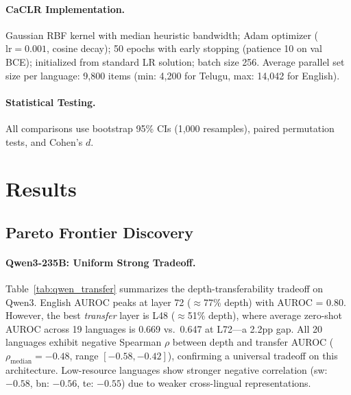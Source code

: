 \documentclass[11pt,a4paper]{article}
\begin{document}
\paragraph{CaCLR Implementation.}
Gaussian RBF kernel with median heuristic bandwidth; Adam optimizer ($\text{lr} = 0.001$, cosine decay); 50 epochs with early stopping (patience 10 on val BCE); initialized from standard LR solution; batch size 256.
Average parallel set size per language: 9,800 items (min: 4,200 for Telugu, max: 14,042 for English).

\paragraph{Statistical Testing.}
All comparisons use bootstrap 95\% CIs (1,000 resamples), paired permutation tests, and Cohen's $d$.

\section{Results}

\subsection{Pareto Frontier Discovery}
\label{sec:pareto}

\paragraph{Qwen3-235B: Uniform Strong Tradeoff.}
Table~\ref{tab:qwen_transfer} summarizes the depth-transferability tradeoff on Qwen3.
English AUROC peaks at layer 72 ($\approx$77\% depth) with AUROC = 0.80.
However, the best \emph{transfer} layer is L48 ($\approx$51\% depth), where average zero-shot AUROC across 19 languages is 0.669 vs.\ 0.647 at L72---a 2.2pp gap.
All 20 languages exhibit negative Spearman $\rho$ between depth and transfer AUROC ($\rho_{\text{median}} = -0.48$, range $[-0.58, -0.42]$), confirming a universal tradeoff on this architecture.
Low-resource languages show stronger negative correlation (sw: $-0.58$, bn: $-0.56$, te: $-0.55$) due to weaker cross-lingual representations.
\end{document}
